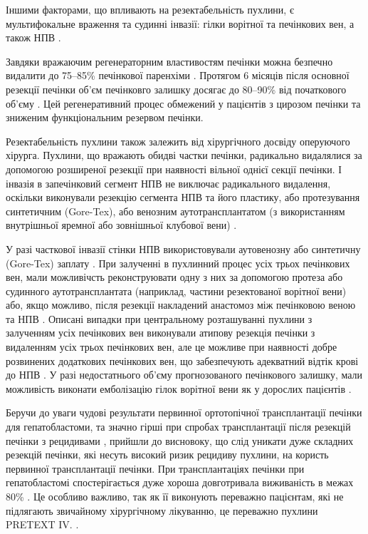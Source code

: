 Іншими факторами, що впливають на резектабельність пухлини, є мультифокальне враження та судинні інвазії: гілки ворітної та печінкових вен, а також НПВ \cite{pmid29761829}.

Завдяки вражаючим регенераторним властивостям печінки можна безпечно видалити до 75–85\% печінкової паренхіми \cite{pmid29888545}. Протягом 6 місяців після основної резекції печінки об’єм печінковго залишку досягає до 80–90\% від початкового об’єму \cite{pmid29906233}. Цей регенеративний процес обмежений у пацієнтів з цирозом печінки та зниженим функціональним резервом печінки. 

Резектабельність пухлини також залежить від хірургічного досвіду оперуючого хірурга. Пухлини, що вражають обидві частки печінки, радикально видалялися за допомогою розширеної резекції при наявності вільної однієї секції печінки.
І інвазія в запечінковий сегмент НПВ не виключає радикального видалення, оскільки виконували резекцію сегмента НПВ та його пластику, або протезування синтетичним (Gore-Tex), або венозним аутотрансплантатом (з використанням внутрішньої яремної або зовнішньої клубової вени) \cite{pmid29906299}.

У разі часткової інвазії стінки НПВ використовували аутовенозну або синтетичну (Gore-Tex) заплату \cite{pmid30003622}. При залученні в пухлинний процес усіх трьох печінкових вен, мали можливічсть реконструювати одну з них за допомогою протеза або судинного аутотрансплантата (наприклад, частини резектованої ворітної вени) або, якщо можливо, після резекції накладений анастомоз між печінковою веною та НПВ \cite{pmid30084209}. Описані випадки при центральному розташуванні пухлини з залученням усіх печінкових вен виконували атипову резекція печінки з видаленням усіх трьох печінкових вен, але це можливе при наявності добре розвинених додаткових печінкових вен, що забезпечують адекватний відтік крові до НПВ \cite{pmid30086577}. У разі недостатнього об’єму прогнозованого печінкового залишку, мали можливість виконати емболізацію гілок ворітної вени як у дорослих пацієнтів \cite{pmid30270490}.

Беручи до уваги чудові результати первинної ортотопічної трансплантації печінки для гепатобластоми, та значно гірші при спробах трансплантації після резекцій печінки з рецидивами \cite{pmid30528797}, прийшли до висновоку, що слід уникати дуже складних резекцій печінки, які несуть високий ризик рецидиву пухлини, на користь первинної трансплантації печінки. При трансплантаціях печінки при гепатобластомі спостерігається дуже хороша довготривала виживаність в межах 80\% \cite{pmid30577683}. Це особливо важливо, так як її виконують переважно пацієнтам, які не підлягають звичайному хірургічному лікуванню, це переважно пухлини PRETEXT IV. \cite{pmid30762666}.

